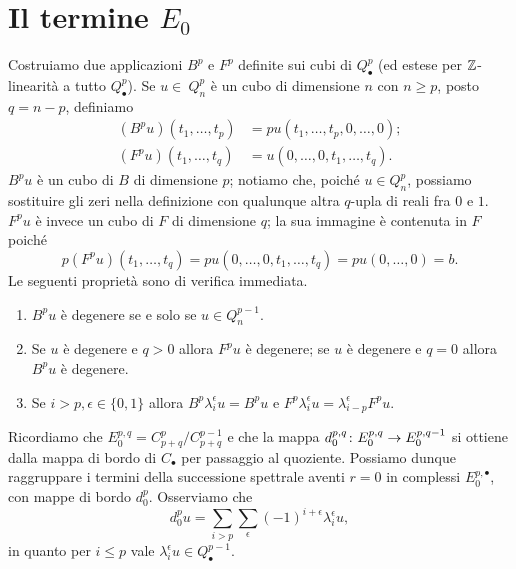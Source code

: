 \section{Il termine \texorpdfstring{$E_0$}{E0}}
Costruiamo due applicazioni $B^p$ e $F^p$ definite sui cubi di $Q^p_\bullet$ (ed estese per $\mathbb{Z}$-linearità a tutto $Q^p_\bullet$). Se $u\in\ Q^p_n$ è un cubo di dimensione $n$ con $n\ge p$, posto $q=n-p$, definiamo
\begin{align*}
(B^pu)(t_1,\ldots,t_p)&=pu(t_1,\ldots,t_p,0,\ldots,0);\\
(F^pu)(t_1,\ldots,t_q)&=u(0,\ldots,0,t_1,\ldots,t_q).
\end{align*}
$B^pu$ è un cubo di $B$ di dimensione $p$; notiamo che, poiché $u\in Q^p_n$, possiamo sostituire gli zeri nella definizione con qualunque altra $q$-upla di reali fra $0$ e $1$. $F^pu$ è invece un cubo di $F$ di dimensione $q$; la sua immagine è contenuta in $F$ poiché
$$
p(F^pu)(t_1,\ldots,t_q)=pu(0,\ldots,0,t_1,\ldots,t_q)=pu(0,\ldots,0)=b.
$$
Le seguenti proprietà sono di verifica immediata.
\begin{enumerate}
\item\label{spectral-sequence-of-fibration:pr1} $B^pu$ è degenere se e solo se $u\in Q^{p-1}_n$.
\item\label{spectral-sequence-of-fibration:pr2} Se $u$ è degenere e $q>0$ allora $F^pu$ è degenere; se $u$ è degenere e $q=0$ allora $B^pu$ è degenere.
\item\label{spectral-sequence-of-fibration:pr3} Se $i>p,\epsilon\in\{0,1\}$ allora $B^p\lambda^\epsilon_iu=B^pu$ e $F^p\lambda^\epsilon_iu=\lambda^\epsilon_{i-p}F^pu$.
\end{enumerate}

Ricordiamo che $E^{p,q}_0=C^p_{p+q}/C^{p-1}_{p+q}$ e che la mappa $d^{p,q}_0\colon E^{p,q}_0\to E^{p,q-1}_0$ si ottiene dalla mappa di bordo di $C_\bullet$ per passaggio al quoziente. Possiamo dunque raggruppare i termini della successione spettrale aventi $r=0$ in complessi $E^{p,\bullet}_0$, con mappe di bordo $d^p_0$. Osserviamo che
$$
d^p_0u=\sum_{i>p}\sum_\epsilon(-1)^{i+\epsilon}\lambda^\epsilon_iu,
$$
in quanto per $i\le p$ vale $\lambda^\epsilon_iu\in Q^{p-1}_\bullet$.

